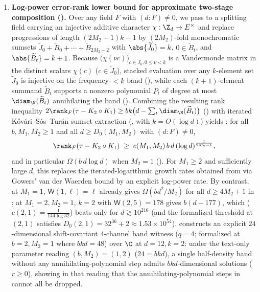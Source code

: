 \begin{enumerate}[label=\arabic*.]
\item \textbf{Log-power error-rank lower bound for approximate two-stage composition ().}
  Over any field $F$ with $(d : F) \ne 0$, we pass to a splitting field carrying an injective
  additive character $\chi : \Z_d \to E^\times$ and replace progressions of length $(2M_2 + 1)k - 1$
  by $(2M_2)$-fold monochromatic sumsets $\widetilde{J}_0 + \widetilde{B}_0 + \cdots +
  \widetilde{B}_{2M_2 - 2}$ with $\abs{\widetilde{J}_0} = k$, $0 \in \widetilde{B}_t$, and
  $\abs{\widetilde{B}_t} = k + 1$. Because $\bigl(\chi(\nu c)\bigr)_{c \in \widetilde{J}_0, 0 \le \nu < k}$
  is a Vandermonde matrix in the distinct scalars $\chi(c)$ ($c \in \widetilde{J}_0$), stacked
  evaluation over any $k$-element set $\widetilde{J}_0$ is injective on the frequency-$< k$ band
  (), while each $(k+1)$-element summand $\widetilde{B}_t$ supports a
  nonzero polynomial $P_t$ of degree at most $\diam_{\N}(\widetilde{B}_t)$ annihilating the band
  (). Combining the resulting rank inequality
  $2\rank_F(\tau - K_2 \circ K_1) \ge bk\bigl(d - \sum_t \diam_{\N}(\widetilde{B}_t)\bigr)$
  () with iterated K\H{o}v\'ari--S\'os--Tur\'an sumset extraction
  (, with $k = O(\log d)$) yields : for all $b, M_1, M_2 \ge 1$ and
  all $d \ge D_0(M_1, M_2)$ with $(d : F) \ne 0$,
  \[
    \rank_F(\tau - K_2 \circ K_1)
    \;\ge\;
    c(M_1, M_2)\,b\,d\,(\log d)^{\frac{1}{2M_2 - 1}},
  \]
  and in particular $\Omega(b\,d\log d)$ when $M_2 = 1$ (). For $M_1 \ge 2$ and
  sufficiently large $d$, this replaces the iterated-logarithmic growth rates obtained from
  \cite[Theorem~6.6]{SharedDecoders2026} via Gowers' van der Waerden bound \cite{Gowers2001} by an
  explicit log-power rate. By contrast, at $M_1 = 1$, $\mathsf{W}(1, \ell) = \ell$ already gives
  $\Omega(bd^2/M_2)$ for all $d \ge 4M_2 + 1$ in \cite[Theorem~6.6]{SharedDecoders2026}; at
  $M_1 = 2, M_2 = 1$, $k = 2$ with $\mathsf{W}(2, 5) = 178$ \cite{StevensShantaram1978} gives
  $b(d - 177)$, which  ($c(2,1) = \frac{1}{144\log 32}$) beats only for
  $d \gtrsim 10^{216}$ (and the formalized threshold at $(2,1)$ satisfies
  $D_0(2,1) = 32^{36} + 2 \approx 1.53 \times 10^{54}$).  constructs an explicit
  $24$-dimensional shift-covariant $4$-channel band witness ($q = 4$; formalized at $b = 2, M_2 = 1$
  where $bkd = 48$) over $\C$ at $d = 12, k = 2$: under the text-only parameter reading
  $(b, M_2) = (1, 2)$ ($24 = bkd$), a single half-density band without any annihilating-polynomial
  step admits $bkd$-dimensional solutions ($r \ge 0$), showing in that reading that the
  annihilating-polynomial steps in  cannot all be dropped.


\end{enumerate}
